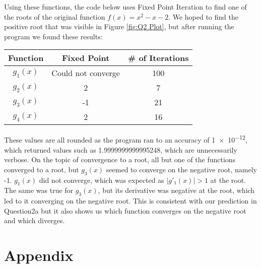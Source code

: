 \documentclass[12pt]{article}
\begin{document}
\begin{enumerate}
        Using these functions, the code below uses Fixed Point Iteration to find one of the roots of the 
        original function $f(x) = x^2 - x - 2$. We hoped to find the positive root that was visible 
        in Figure \ref{fig:Q2 Plot}, but after running the program we found these results:

        \begin{table}[H]
            \centering
            \begin{tabular}{ccc}
                \hline
                Function & Fixed Point & \# of Iterations \\
                \hline
                $g_1(x)$ & Could not converge & 100 \\
                $g_2(x)$ & 2 & 7 \\
                $g_3(x)$ & -1 & 21 \\
                $g_4(x)$ & 2 & 16 \\
                \hline
            \end{tabular}
        \end{table}

        These values are all rounded as the program ran to an accuracy of \num{1e-12}, which returned values 
        such as 1.9999999999995248, which are unnecessarily verbose. 
        \newline
        On the topic of convergence to a root, all but one of the functions converged to a root, but 
        $g_3(x)$ seemed to converge on the negative root, namely -1. $g_1(x)$ did not converge, which was 
        expected as $|g'_1(x)| > 1$ at the root. The same was true for $g_3(x)$, but its derivative was 
        negative at the root, which led to it converging on the negative root. This is consistent with our 
        prediction in Question2a but it also shows us which function converges on the negative root and 
        which diverges. 
        \newline
        
        
        \newpage
        \section*{Appendix}
        
        
        
    \end{enumerate}
\end{document}
